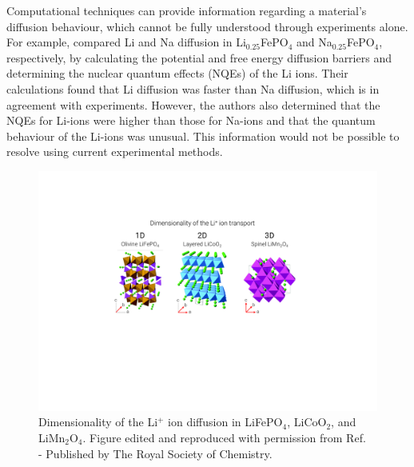 \documentclass[../main.tex]{subfiles}
\begin{document}
Computational techniques can provide information regarding a material's diffusion behaviour, which cannot be fully understood through experiments alone. For example, \citeauthor{dixit2015classical} compared Li and Na diffusion in Li$_{0.25}$FePO$_4$ and Na$_{0.25}$FePO$_4$, respectively, by calculating the potential and free energy diffusion barriers and determining the nuclear quantum effects (NQEs) of the Li ions.\cite{dixit2015classical} Their calculations found that Li diffusion was faster than Na diffusion, which is in agreement with experiments. However, the authors also determined that the NQEs for Li-ions were higher than those for Na-ions and that the quantum behaviour of the Li-ions was unusual. This information would not be possible to resolve using current experimental methods.

\begin{figure}
    \centering
    \includegraphics[scale=0.8]{figures/cathode_diffusion_pathways.pdf}
    \caption{Dimensionality of the Li$^+$ ion diffusion in LiFePO$_4$, LiCoO$_2$, and LiMn$_2$O$_4$. Figure edited and reproduced with permission from Ref.~ - Published by The Royal Society of Chemistry.}
    \label{fig:cathode_diffusion_pathways}
\end{figure}
\end{document}
